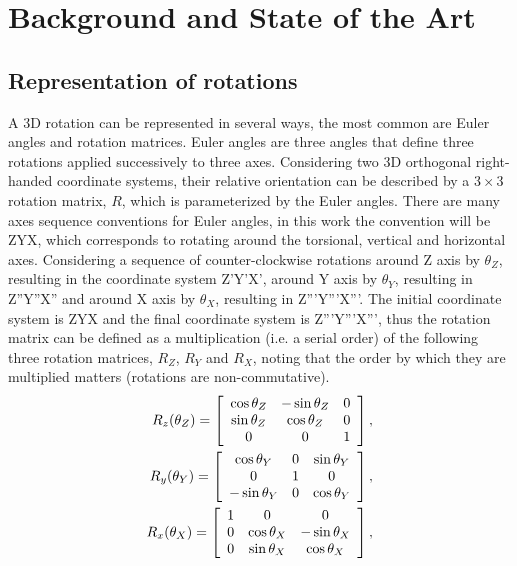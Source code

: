 \section{Background and State of the Art}
\label{chapter:background}

\subsection{Representation of rotations}
\label{cha2:represent}
A 3D rotation can be represented in several ways, the most common are Euler angles and rotation matrices. Euler angles are three angles that define three rotations applied successively to three axes. Considering two 3D orthogonal right-handed coordinate systems, their relative orientation can be described by a $3\times3$ rotation matrix, $R$, which is parameterized by the Euler angles. There are many axes sequence conventions for Euler angles, in this work the convention will be ZYX, which corresponds to rotating around the torsional, vertical and horizontal axes. Considering a sequence of counter-clockwise rotations around Z axis by $\theta_Z$, resulting in the coordinate system Z'Y'X', around Y axis by $\theta_Y$, resulting in Z''Y''X'' and around X axis by $\theta_X$, resulting in Z'''Y'''X'''. 
The initial coordinate system is ZYX and the final coordinate system is Z'''Y'''X''', thus the rotation matrix can be defined as a multiplication (i.e. a serial order) of the following three rotation matrices, $R_Z$, $R_Y$ and $R_X$, noting that the order by which they are multiplied matters (rotations are non-commutative).
\begin{align}
\label{rrr}
R _ { z } ( \theta_Z ) = \left[ \begin{array} { c c c } { \cos \theta_Z } & { - \sin \theta_Z } & { 0 } \\ { \sin \theta_Z } & { \cos \theta_Z } & { 0 } \\ { 0 } & { 0 } & { 1 } \end{array} \right],\\ 
R _ { y } ( \theta_Y ) = \left[ \begin{array} { c c c } { \cos \theta_Y } & { 0 } & { \sin \theta_Y } \\ { 0 } & { 1 } & { 0 } \\ { - \sin \theta_Y } & { 0 } & { \cos \theta_Y } \end{array} \right], \\
R _ { x } ( \theta_X ) = \left[ \begin{array} { c c c } { 1 } & { 0 } & { 0 } \\ { 0 } & { \cos \theta_X } & { - \sin \theta_X } \\ { 0 } & { \sin \theta_X } & { \cos \theta_X} \end{array} \right],
\end{align}

